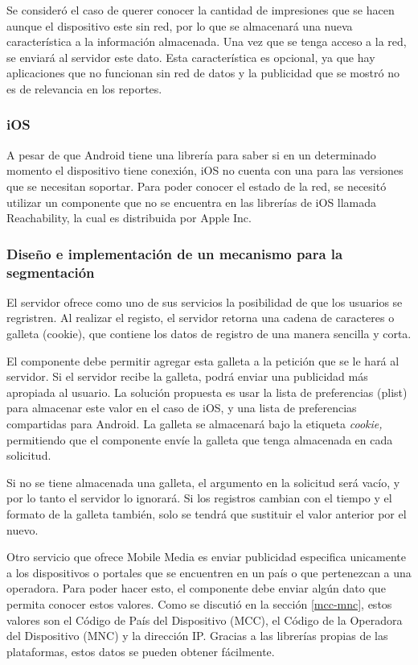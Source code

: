 Se consideró el caso de querer conocer la cantidad de impresiones
que se hacen aunque el dispositivo este sin red, por lo que se almacenará
una nueva característica a la información almacenada. Una vez que
se tenga acceso a la red, se enviará al servidor este dato. Esta característica
es opcional, ya que hay aplicaciones que no funcionan sin red de datos
y la publicidad que se mostró no es de relevancia en los reportes.


\subsubsection*{iOS}

A pesar de que Android tiene una librería para saber si en un determinado
momento el dispositivo tiene conexión, iOS no cuenta con una para
las versiones que se necesitan soportar. Para poder conocer el estado
de la red, se necesitó utilizar un componente que no se encuentra
en las librerías de iOS llamada Reachability, la cual es distribuida
por Apple Inc.


\subsubsection{Diseño e implementación de un mecanismo para la segmentación}

El servidor ofrece como uno de sus servicios la posibilidad de que
los usuarios se regristren. Al realizar el registo, el servidor retorna
una cadena de caracteres o galleta (cookie), que contiene los datos
de registro de una manera sencilla y corta. 

El componente debe permitir agregar esta galleta a la petición que
se le hará al servidor. Si el servidor recibe la galleta, podrá enviar
una publicidad más apropiada al usuario. La solución propuesta es
usar la lista de preferencias (plist) para almacenar este valor en
el caso de iOS, y una lista de preferencias compartidas para Android.
La galleta se almacenará bajo la etiqueta \textit{cookie, }permitiendo
que el componente envíe la galleta que tenga almacenada en cada solicitud.

Si no se tiene almacenada una galleta, el argumento en la solicitud
será vacío, y por lo tanto el servidor lo ignorará. Si los registros
cambian con el tiempo y el formato de la galleta también, solo se
tendrá que sustituir el valor anterior por el nuevo. 

Otro servicio que ofrece Mobile Media es enviar publicidad especifica
unicamente a los dispositivos o portales que se encuentren en un país
o que pertenezcan a una operadora. Para poder hacer esto, el componente
debe enviar algún dato que permita conocer estos valores. Como se
discutió en la sección \ref{mcc-mnc}, estos valores son el Código
de País del Dispositivo (MCC), el Código de la Operadora del Dispositivo
(MNC) y la dirección IP. Gracias a las librerías propias de las plataformas,
estos datos se pueden obtener fácilmente.

